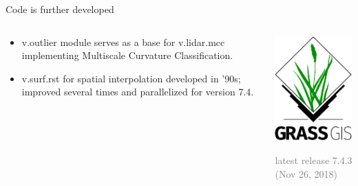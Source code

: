 \documentclass[xcolor={dvipsnames,usenames},beamer,aspectratio=169]{beamer}
\begin{document}
\begin{frame}{Code is further developed}

\begin{columns}
\begin{column}{0.6\textwidth}

\begin{itemize}
  \item v.outlier module serves as a base for v.lidar.mcc implementing Multiscale Curvature Classification.
  \item v.surf.rst for spatial interpolation developed in ’90s; improved several times and parallelized for version 7.4.
\end{itemize}

\end{column}
\begin{column}{0.3\textwidth}

\begin{center}
  \includegraphics[width=\textwidth]{logos/grass_gis}
\end{center}

\vspace*{-1ex}

\textcolor{gray}{
\footnotesize
latest release 7.4.3
\scriptsize
(Nov 26, 2018)
}

\end{column}
\end{columns}

\end{frame}
\end{document}
